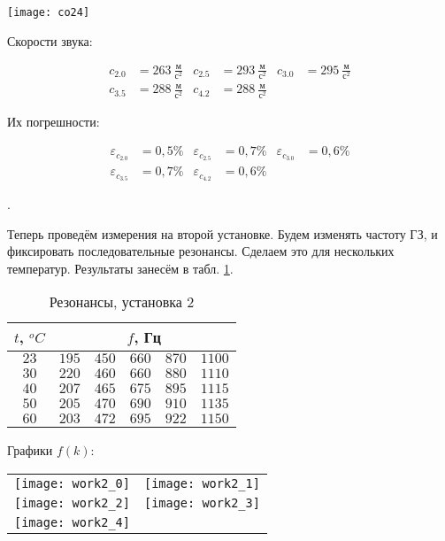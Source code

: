 \documentclass[a4paper, 12pt]{article}
\newcommand{\eps}{\varepsilon}
\newcounter{Points}
\newcommand{\point}{\arabic{Points}. \addtocounter{Points}{1}}
\begin{document}
\texttt{[image: co24]}

Скорости звука:

\begin{align*}
    c_{2.0} &= 263 ~\frac{\text{м}}{\text{с}^2} &
    c_{2.5} &= 293 ~\frac{\text{м}}{\text{с}^2} &
    c_{3.0} &= 295 ~\frac{\text{м}}{\text{с}^2} \\
    c_{3.5} &= 288 ~\frac{\text{м}}{\text{с}^2} &
    c_{4.2} &= 288 ~\frac{\text{м}}{\text{с}^2}  
\end{align*}

Их погрешности:

\begin{align*}
    \eps_{c_{2.0}} &= 0,5\% &
    \eps_{c_{2.5}} &= 0,7\% &
    \eps_{c_{3.0}} &= 0,6\% \\
    \eps_{c_{3.5}} &= 0,7\% &
    \eps_{c_{4.2}} &= 0,6\% 
\end{align*}

\point Теперь проведём измерения на второй установке. Будем изменять частоту ГЗ, и фиксировать последовательные резонансы. Сделаем это для нескольких температур. Результаты занесём в табл. \ref{tabl:3}.

\begin{table}[!h]
    \begin{tabularx}{\linewidth}{|c|X|X|X|X|X|}
        \hline
        $t$, $^o C$ & \multicolumn{5}{c|}{$f$, Гц} \\ \hline
        $23$ & $195$ & $450$ & $660$ & $870$ & $1100$ \\ \hline
        $30$ & $220$ & $460$ & $660$ & $880$ & $1110$ \\ \hline
        $40$ & $207$ & $465$ & $675$ & $895$ & $1115$ \\ \hline
        $50$ & $205$ & $470$ & $690$ & $910$ & $1135$ \\ \hline
        $60$ & $203$ & $472$ & $695$ & $922$ & $1150$ \\ \hline 
    \end{tabularx}
\caption{Резонансы, установка 2}
\label{tabl:3}
\end{table}

Графики $f (k)$:

\begin{tabular}{cc}
    \texttt{[image: work2\_0]} &
    \texttt{[image: work2\_1]} \\
    \texttt{[image: work2\_2]} &
    \texttt{[image: work2\_3]} \\
    \texttt{[image: work2\_4]} 
\end{tabular}
\end{document}
